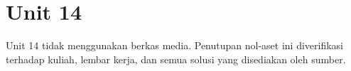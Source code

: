 \section*{Unit 14}
Unit 14 tidak menggunakan berkas media. Penutupan nol-aset ini diverifikasi terhadap kuliah, lembar kerja, dan semua solusi yang disediakan oleh sumber.
